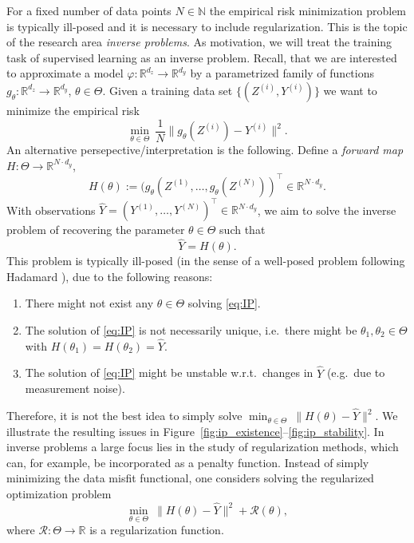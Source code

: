 \documentclass[12pt,openany]{book}
\theoremstyle{definition}
\theoremstyle{definition}
\newcommand{\N}{\mathbb{N}}
\newcommand{\R}{\mathbb{R}}
\begin{document}
\begin{outlook}
For a fixed number of data points $N\in\N$ the empirical risk minimization problem is typically ill-posed and it is necessary to include regularization. This is the topic of the research area \textit{inverse problems}. As motivation, we will treat the training task of supervised learning as an inverse problem. Recall, that we are interested to approximate a model $\varphi:\R^{d_z}\to\R^{d_y}$ by a parametrized family of functions $g_\theta:\R^{d_z}\to\R^{d_y}$, $\theta\in\Theta$. Given a training data set $\{(Z^{(i)},Y^{(i)})\}$ we want to minimize the empirical risk
\[\min_{\theta\in\Theta}\ \frac1N\|g_\theta(Z^{(i)})-Y^{(i)}\|^2. \]
An alternative persepective/interpretation is the following. Define a \textit{forward map} $H:\Theta\to\R^{N\cdot d_y}$,
\[H(\theta) := (g_\theta(Z^{(1)},\dots,g_\theta(Z^{(N)}))^\top\in\R^{N\cdot d_y}. \]
With observations $\widehat Y = (Y^{(1)},\dots,Y^{(N)})^\top\in\R^{N\cdot d_y}$, we aim to solve the inverse problem of recovering the parameter $\theta\in\Theta$ such that
\begin{equation}\label{eq:IP}
\widehat Y = H(\theta).
\end{equation}
This problem is typically ill-posed (in the sense of a well-posed problem following Hadamard \cite{H1902}), due to the following reasons:
\begin{enumerate}
\item There might not exist any $\theta\in\Theta$ solving \eqref{eq:IP}.
\item The solution of \eqref{eq:IP} is not necessarily unique, i.e.~there might be $\theta_1,\theta_2\in\Theta$ with $H(\theta_1) = H(\theta_2) = \widehat Y$.
\item The solution of \eqref{eq:IP} might be unstable w.r.t.~changes in $\widehat Y$ (e.g.~due to measurement noise).
\end{enumerate}
Therefore, it is not the best idea to simply solve $\min_{\theta\in\Theta}\ \|H(\theta)-\widehat Y\|^2$. We illustrate the resulting issues in Figure~\ref{fig:ip_existence}--\ref{fig:ip_stability}. In inverse problems a large focus lies in the study of regularization methods, which can, for example, be incorporated as a penalty function. Instead of simply minimizing the data misfit functional, one considers solving the regularized optimization problem 
\[\min_{\theta\in\Theta}\ \|H(\theta)-\widehat Y\|^2 + \mathcal R(\theta),\]
where $\mathcal R: \Theta \to \R$ is a regularization function.
\end{outlook}
\end{document}
